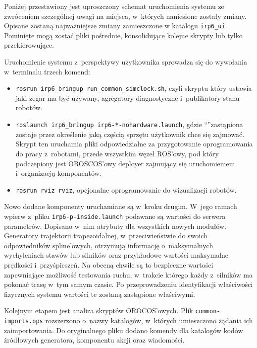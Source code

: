 \documentclass[a4paper, 12pt]{article}
\begin{document}
	Poniżej przestawiony jest uproszczony schemat uruchomienia systemu ze zwróceniem szczególnej uwagi na miejsca, w~których naniesione zostały zmiany. Opisane zostaną najważniejsze zmiany zamieszczone w katalogu \texttt{irp6\_ui}. Pominięte mogą zostać pliki pośrednie, konsolidujące kolejne skrypty lub tylko przekierowujące. 
	\par Uruchomienie systemu z~perspektywy użytkownika sprowadza się do wywołania w~terminalu trzech komend:
	\begin{itemize}
	\item \texttt{rosrun irp6\_bringup run\_common\_simclock.sh}, czyli skryptu który ustawia jaki zegar ma być używany, agregatory diagnostyczne i~publikatory stanu robotów. 
	\item \texttt{roslaunch irp6\_bringup irp6-*-nohardware.launch}, gdzie \textquotedblleft * \textquotedblright zastąpiona zostaje przez określenie jaką częścią sprzętu użytkownik chce się zajmować. Skrypt ten uruchamia pliki odpowiedzialne za przygotowanie oprogramowania do pracy z~robotami, przede wszystkim węzeł ROS'owy, pod który podczepiony jest OROSCOS'owy deployer zajmujący się uruchomieniem i~organizacją komponentów.
	\item \texttt{rosrun rviz rviz}, opcjonalne oprogramowanie do wizualizacji robotów.
	\end{itemize} 
	\par
	Nowo dodane komponenty uruchamiane są w~kroku drugim. W~jego ramach wpierw z~pliku \linebreak \texttt{irp6-p-inside.launch} podawane są wartości do serwera parametrów. Dopisano w~nim atrybuty dla wszystkich nowych modułów. 
	Generatory trajektorii trapezoidalnej, w~przeciwieństwie do swoich odpowiedników spline'owych, otrzymują informację o~maksymalnych wychyleniach stawów lub silników oraz przykładowe wartości maksymalne prędkości i~przyśpieszeń. Na obecną chwile są to bezpieczne wartości zapewniające możliwość testowania ruchu, w~trakcie którego każdy z~silników ma pokonać trasę w~tym samym czasie. 
	Po przeprowadzeniu identyfikacji właściwości fizycznych systemu wartości te zostaną zastąpione właściwymi.
	\par 
	Kolejnym etapem jest analiza skryptów OROCOS'owych. Plik \texttt{common-imports.ops} rozszerzono o~nazwy katalogów, w~których umieszczono żądania ich zaimportowania. Do oryginalnego pliku dodano komendy dla katalogów kodów źródłowych generatora, komponentu akcji oraz wiadomości.
	\par
\end{document}
